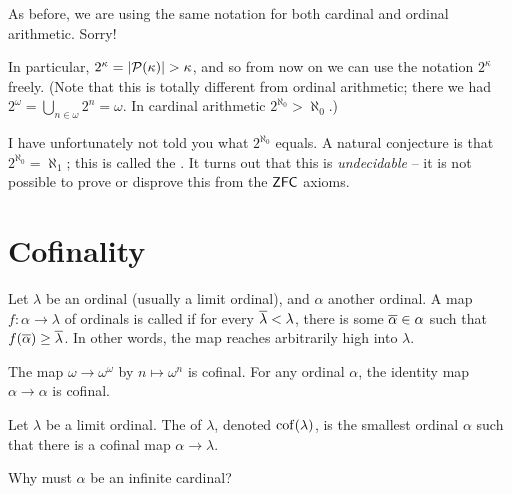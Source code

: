 \begin{abuse}
	As before, we are using the same notation for
	both cardinal and ordinal arithmetic. Sorry!
\end{abuse}

In particular, $2^\kappa = \left\lvert \mathcal P(\kappa) \right\rvert > \kappa$,
and so from now on we can use the notation $2^\kappa$ freely.
(Note that this is totally different from ordinal arithmetic;
there we had $2^\omega = \bigcup_{n\in\omega} 2^n = \omega$.
In cardinal arithmetic $2^{\aleph_0} > \aleph_0$.)

I have unfortunately not told you what $2^{\aleph_0}$ equals.
A natural conjecture is that $2^{\aleph_0} = \aleph_1$; this is called the
.
It turns out that this is \emph{undecidable} -- it is not possible
to prove or disprove this from the $\mathsf{ZFC}$ axioms.

\section{Cofinality}

\begin{definition}
	Let $\lambda$ be an ordinal (usually a limit ordinal),
	and $\alpha$ another ordinal.
	A map $f \colon \alpha \to \lambda$ of ordinals is called 
	if for every $\overline\lambda < \lambda$, there is some $\overline\alpha \in \alpha$
	such that $f(\overline\alpha) \ge \overline\lambda$.
	In other words, the map reaches arbitrarily high into $\lambda$.
\end{definition}
\begin{example}
	\listhack
	\begin{enumerate}[(a)]
		\ii The map $\omega \to \omega^\omega$ by $n \mapsto \omega^n$ is cofinal.
		\ii For any ordinal $\alpha$, the identity map $\alpha \to \alpha$ is cofinal.
	\end{enumerate}
\end{example}

\begin{definition}
	Let $\lambda$ be a limit ordinal.
	The  of $\lambda$, denoted $\operatorname{cof}(\lambda)$,
	is the smallest ordinal $\alpha$ such that there is a cofinal map
	$\alpha \to \lambda$.
\end{definition}
\begin{ques}
	Why must $\alpha$ be an infinite cardinal?
\end{ques}

